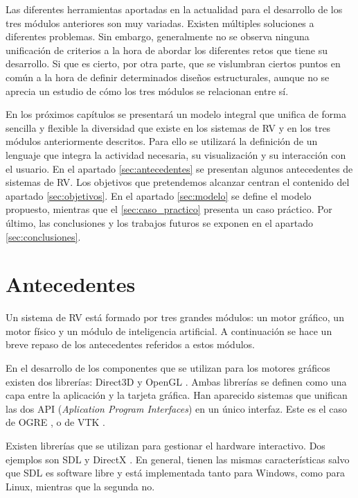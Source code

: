 \documentclass{egpubl}
\begin{document}
 Las diferentes herramientas aportadas en la actualidad para el
desarrollo de los tres m\'odulos anteriores son muy variadas. Existen
m\'ultiples soluciones a diferentes problemas. Sin embargo,
generalmente no se observa ninguna unificaci\'on de criterios a la hora
de abordar los diferentes retos que tiene su desarrollo. Si que es
cierto, por otra parte, que se vislumbran ciertos puntos en com\'un a
la hora de definir determinados dise\~nos estructurales, aunque no se
aprecia un estudio de c\'omo los tres m\'odulos se relacionan entre
s\'i.

 En los pr\'oximos cap\'itulos se presentar\'a un modelo integral que
unifica de forma sencilla y flexible la diversidad que existe en los
sistemas de RV y en los tres m\'odulos anteriormente descritos. Para
ello se utilizar\'a la definici\'on de un lenguaje que integra la
actividad necesaria, su visualizaci\'on y su interacci\'on con el
usuario. En el apartado \ref{sec:antecedentes} se presentan algunos antecedentes de sistemas
de RV. Los objetivos que pretendemos alcanzar centran el contenido del
apartado \ref{sec:objetivos}. En el apartado \ref{sec:modelo} se define el modelo propuesto,
mientras que el \ref{sec:caso_practico} presenta un caso pr\'actico. Por \'ultimo, las
conclusiones y los trabajos futuros se exponen en el apartado \ref{sec:conclusiones}.



\section{Antecedentes
\label{sec:antecedentes}}

Un sistema de RV est\'a formado por tres grandes m\'odulos: 
un motor gr\'afico, un motor f\'isico y un m\'odulo de inteligencia artificial. 
A continuaci\'on se hace un breve repaso de los antecedentes referidos a estos
m\'odulos.

En el desarrollo de los componentes que se utilizan para los motores
gr\'aficos existen dos librer\'ias: Direct3D \cite{DirectX} y
OpenGL \cite{OpenGL}. Ambas librer\'ias se definen como una capa entre la aplicaci\'on y la tarjeta gr\'afica.
Han aparecido sistemas que unifican las dos API 
(\textit{Aplication Program Interfaces}) en un \'unico interfaz. Este es el caso de OGRE
\cite{OGRE}, o de VTK \cite{VTK}.

Existen librer\'ias que se utilizan para gestionar el hardware interactivo.
Dos ejemplos son SDL \cite{SDL} y DirectX \cite{DirectX}. En general, tienen las 
mismas caracter\'isticas salvo que SDL es software libre y est\'a implementada 
tanto para Windows, como para Linux, mientras que la segunda no.
\end{document}
